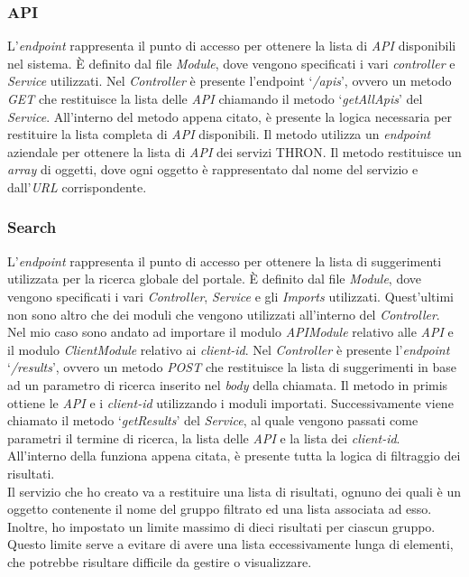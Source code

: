 \subsubsection{API}\label{subsubsec:api}
L'\textit{endpoint} rappresenta il punto di accesso per ottenere la lista di \textit{API} disponibili nel sistema.
È definito dal file \textit{Module}, dove vengono specificati i vari \textit{controller} e \textit{Service} utilizzati.
Nel \textit{Controller} è presente l'endpoint `\textit{/apis}', ovvero un metodo \textit{GET} che restituisce la lista delle \textit{API} chiamando il metodo `\textit{getAllApis}' del \textit{Service}.
All'interno del metodo appena citato, è presente la logica necessaria per restituire la lista completa di \textit{API} disponibili.
Il metodo utilizza un \textit{endpoint} aziendale per ottenere la lista di \textit{API} dei servizi THRON.
Il metodo restituisce un \textit{array} di oggetti, dove ogni oggetto è rappresentato dal nome del servizio e dall'\textit{URL} corrispondente.

\subsubsection{Search}\label{susubsec:search}
L'\textit{endpoint} rappresenta il punto di accesso per ottenere la lista di suggerimenti utilizzata per la ricerca globale del portale.
È definito dal file \textit{Module}, dove vengono specificati i vari \textit{Controller}, \textit{Service} e gli \textit{Imports} utilizzati. 
Quest'ultimi non sono altro che dei moduli che vengono utilizzati all'interno del \textit{Controller}. Nel mio caso sono andato ad importare il modulo \textit{APIModule}
relativo alle \textit{API} e il modulo \textit{ClientModule} relativo ai \textit{client-id}.
Nel \textit{Controller} è presente l'\textit{endpoint} `\textit{/results}', ovvero un metodo \textit{POST} che restituisce la lista di suggerimenti in base ad un parametro di ricerca
inserito nel \textit{body} della chiamata. Il metodo in primis ottiene le \textit{API} e i \textit{client-id} utilizzando i moduli importati. 
Successivamente viene chiamato il metodo `\textit{getResults}' del \textit{Service}, al quale vengono passati come parametri il termine di ricerca, la lista delle \textit{API} e la lista dei \textit{client-id}.
All'interno della funziona appena citata, è presente tutta la logica di filtraggio dei risultati.\\
Il servizio che ho creato va a restituire una lista di risultati, ognuno dei quali è un oggetto contenente il nome del gruppo filtrato ed una lista associata ad esso.
Inoltre, ho impostato un limite massimo di dieci risultati per ciascun gruppo. Questo limite serve a evitare di avere una lista eccessivamente lunga di elementi, che potrebbe risultare difficile da gestire o visualizzare.